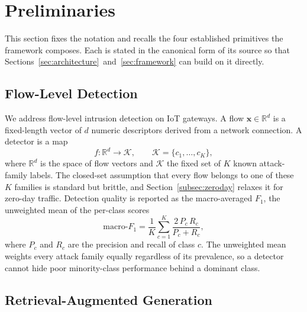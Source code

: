 \section{Preliminaries}
\label{sec:preliminaries}

This section fixes the notation and recalls the four established primitives
the framework composes. Each is stated in the canonical form of its source so
that Sections~\ref{sec:architecture}~and~\ref{sec:framework} can build on it
directly.

\subsection{Flow-Level Detection}
\label{subsec:flowdetection}

We address flow-level intrusion detection on IoT gateways. A flow
$\mathbf{x} \in \mathbb{R}^{d}$ is a fixed-length vector of $d$ numeric
descriptors derived from a network connection. A detector is a map
\begin{equation}
  f : \mathbb{R}^{d} \to \mathcal{K},
  \qquad
  \mathcal{K} = \{c_1, \dots, c_K\},
  \label{eq:detector}
\end{equation}
where $\mathbb{R}^{d}$ is the space of flow vectors and $\mathcal{K}$ the
fixed set of $K$ known attack-family labels. The closed-set assumption that
every flow belongs to one of these $K$ families is standard but brittle, and
Section~\ref{subsec:zeroday} relaxes it for zero-day traffic. Detection
quality is reported as the macro-averaged $F_1$, the unweighted mean of the
per-class scores~\cite{sokolova2009metrics}
\begin{equation}
  \text{macro-}F_1 = \frac{1}{K} \sum_{c=1}^{K}
    \frac{2 \, P_c \, R_c}{P_c + R_c},
  \label{eq:macrof1}
\end{equation}
where $P_c$ and $R_c$ are the precision and recall of class $c$. The
unweighted mean weights every attack family equally regardless of its
prevalence, so a detector cannot hide poor minority-class performance behind
a dominant class.

\subsection{Retrieval-Augmented Generation}
\label{subsec:ragsynthesis}

